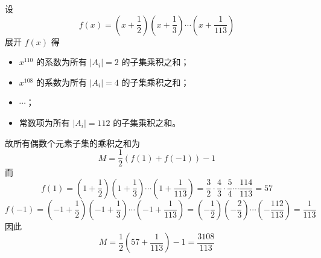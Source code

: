 \begin{questions}
    \begin{solution}
        设
        \[
        f(x) = \left(x + \frac{1}{2}\right)\left(x + \frac{1}{3}\right)\cdots\left(x + \frac{1}{113}\right)
        \]
        展开 $f(x)$ 得
        \begin{itemize}
            \item $x^{110}$ 的系数为所有 $|A_i| = 2$ 的子集乘积之和；
            \item $x^{108}$ 的系数为所有 $|A_i| = 4$ 的子集乘积之和；
            \item $\cdots$；
            \item 常数项为所有 $|A_i| = 112$ 的子集乘积之和。
        \end{itemize}
        故所有偶数个元素子集的乘积之和为
        \[
        M = \frac{1}{2} \left( f(1) + f(-1) \right) - 1
        \]
        而
        \[
        f(1) = \left(1 + \frac{1}{2}\right)\left(1 + \frac{1}{3}\right)\cdots\left(1 + \frac{1}{113}\right)
        = \frac{3}{2} \cdot \frac{4}{3} \cdot \frac{5}{4} \cdots \frac{114}{113} = 57
        \]
        \[
        f(-1) = \left(-1 + \frac{1}{2}\right)\left(-1 + \frac{1}{3}\right)\cdots\left(-1 + \frac{1}{113}\right)
        = \left(-\frac{1}{2}\right)\left(-\frac{2}{3}\right)\cdots\left(-\frac{112}{113}\right) = \frac{1}{113}
        \]
        因此
        \[
        M = \frac{1}{2} \left( 57 + \frac{1}{113} \right) - 1 = \frac{3108}{113}
        \]
    \end{solution}


\end{questions}
